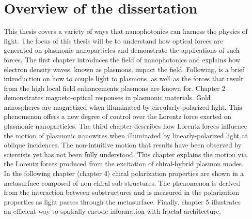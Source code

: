 \section{Overview of the dissertation}
This thesis covers a variety of ways that nanophotonics can harness the physics of light. The focus of this thesis will be to understand how optical forces are generated on plasmonic nanoparticles and demonstrate the applications of such forces. 
The first chapter introduces the field of nanophotonics and explains how electron density waves, known as plasmons, impact the field. Following, is a brief introduction on how to couple light to plasmons, as well as the forces that result from the high local field enhancements plasmons are known for. Chapter 2 demonstrates magneto-optical responses in plasmonic materials. Gold nanospheres are magnetized when illuminated by circularly-polarized light. This phenomenon offers a new degree of control over the Lorentz force exerted on plasmonic nanoparticles. The third chapter describes how Lorentz forces influence the motion of plasmonic nanowires when illuminated by linearly-polarized light at oblique incidences. The non-intuitive motion that results have been observed by scientists yet has not been fully understood. This chapter explains the motion via the Lorentz forces produced from the excitation of chiral-hybrid plasmon modes. In the following chapter (chapter 4) chiral polarization properties are shown in a metasurface composed of non-chiral sub-structures. The phenomenon is derived from the interaction between substructures and is measured in the polarization properties as light passes through the metasurface. Finally, chapter 5 illustrates an efficient way to spatially encode information with fractal architecture.


